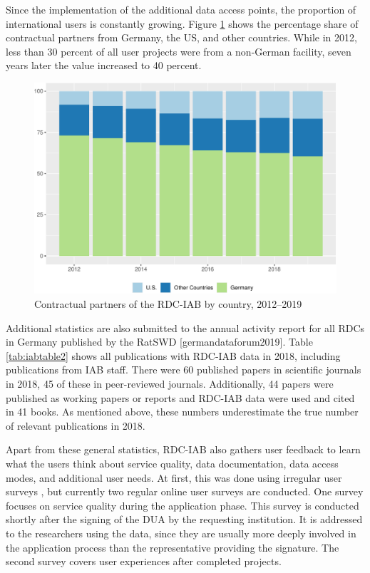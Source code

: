 Since the implementation of the additional data access points, the proportion of international users is constantly growing. Figure \ref{fig:iabfig3} shows the percentage share of contractual partners from Germany, the US, and other countries. While in 2012, less than 30 percent of all user projects were from a non-German facility, seven years later the value increased to 40 percent.

\begin{figure}
\centering
\includegraphics{figures/iabfig3-1.pdf}
\caption{\label{fig:iabfig3}Contractual partners of the RDC-IAB by country, 2012--2019}
\end{figure}

Additional statistics are also submitted to the annual activity report for all RDCs in Germany published by the RatSWD {[}germandataforum2019{]}. Table \ref{tab:iabtable2} shows all publications with RDC-IAB data in 2018, including publications from IAB staff. There were 60 published papers in scientific journals in 2018, 45 of these in peer-reviewed journals. Additionally, 44 papers were published as working papers or reports and RDC-IAB data were used and cited in 41 books. As mentioned above, these numbers underestimate the true number of relevant publications in 2018.



Apart from these general statistics, RDC-IAB also gathers user feedback to learn what the users think about service quality, data documentation, data access modes, and additional user needs. At first, this was done using irregular user surveys \citep{wolter2018}, but currently two regular online user surveys are conducted. One survey focuses on service quality during the application phase. This survey is conducted shortly after the signing of the DUA by the requesting institution. It is addressed to the researchers using the data, since they are usually more deeply involved in the application process than the representative providing the signature. The second survey covers user experiences after completed projects.

